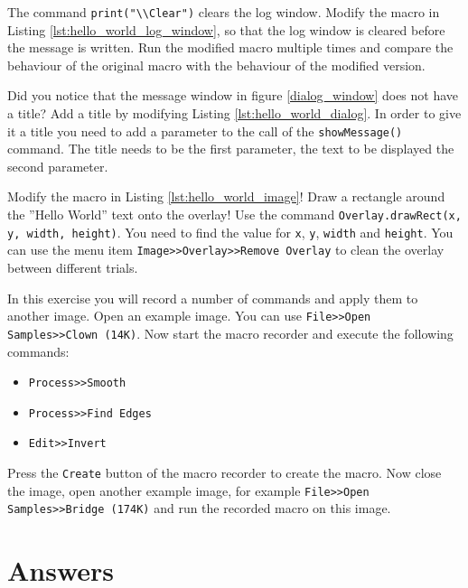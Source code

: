 \begin{ExerciseList}
\label{ex_2_1}

The command {\tt print("\textbackslash \textbackslash Clear")} clears the log window. Modify the macro in Listing \ref{lst:hello_world_log_window}, so that the log window is cleared before the message is written. Run the modified macro multiple times and compare the behaviour of the original macro with the behaviour of the modified version.

\label{ex_2_2}

Did you notice that the message window in figure \ref{dialog_window} does not have a title? Add a title by modifying Listing \ref{lst:hello_world_dialog}. In order to give it a title you need to add a parameter to the call of the {\tt showMessage()} command. The title needs to be the first parameter, the text to be displayed the second parameter.

\label{ex_2_3}

Modify the macro in Listing \ref{lst:hello_world_image}! Draw a rectangle around the ''Hello World'' text onto the overlay! Use the command {\tt Overlay.drawRect(x, y, width, height)}. You need to find the value for {\tt x}, {\tt y}, {\tt width} and {\tt height}. You can use the menu item {\tt Image>>Overlay>>Remove Overlay} to clean the overlay between different trials. 

\label{ex_2_4}
In this exercise you will record a number of commands and apply them to another image. Open an example image. You can use {\tt File>>Open Samples>>Clown (14K)}. Now start the macro recorder and execute the following commands: 
\begin{itemize}
\item {\tt Process>>Smooth}
\item {\tt Process>>Find Edges}
\item {\tt Edit>>Invert}
\end{itemize}
Press the {\tt Create} button of the macro recorder to create the macro. Now close the image, open another example image, for example {\tt File>>Open Samples>>Bridge (174K)} and run the recorded macro on this image.

\newpage

\section{Answers}


\end{ExerciseList}
